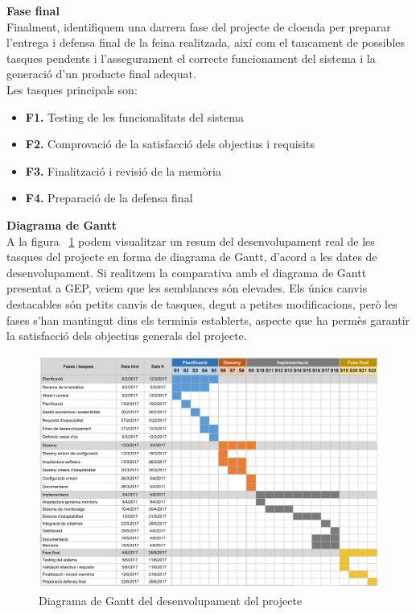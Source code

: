 \noindent \textbf{\large Fase final}\\

\noindent Finalment, identifiquem una darrera fase del projecte de cloenda per preparar l’entrega i defensa final de la feina realitzada, així com el tancament de possibles tasques pendents i l'assegurament el correcte funcionament del sistema i la generació d’un producte final adequat. \\

Les tasques principals son:

\begin{itemize}
\item \textbf{F1.} Testing de les funcionalitats del sistema
\item \textbf{F2.} Comprovació de la satisfacció dels objectius i requisits
\item \textbf{F3.} Finalització i revisió de la memòria
\item \textbf{F4.} Preparació de la defensa final
\end{itemize}

\noindent \textbf{\large Diagrama de Gantt}\\

A la figura ~\ref{fig:gantt} podem visualitzar un resum del desenvolupament real de les tasques del projecte en forma de diagrama de Gantt, d'acord a les dates de desenvolupament. Si realitzem la comparativa amb el diagrama de Gantt presentat a GEP, veiem que les semblances són elevades. Els únics canvis destacables són petits canvis de tasques, degut a petites modificacions, però les fases s'han mantingut dins els terminis establerts, aspecte que ha permès garantir la satisfacció dels objectius generals del projecte.

\begin{figure}
\centering
\includegraphics[width=14cm]{Figures/gantt}
\decoRule
\caption[Diagrama de Gantt del desenvolupament del projecte]{Diagrama de Gantt del desenvolupament del projecte}
\label{fig:gantt}
\end{figure}


